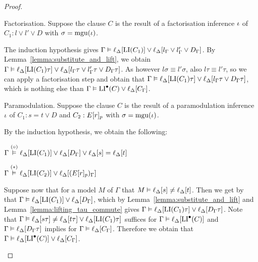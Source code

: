 \documentclass[,%
	draft=false,%
	numbers=noendperiod
	11pt,
	a4paper,
	oneside,%
	openany,
]{memoir}
\begin{document}
\begin{proof}
\begin{description}

		\item{} Factorisation. 
			Suppose the clause $C$ is the result of a factorisation inference $\iota$ of $C_1: l \lor l' \lor D$ with $\sigma=\operatorname{mgu}(\iota)$.
			
			The induction hypothesis gives $\Gamma \vDash \ell_{\Delta}[ \operatorname{LI}(C_1) ] \lor \ell_{\Delta}[ l_\Gamma \lor l'_\Gamma \lor D_\Gamma ]$.
			By Lemma~\ref{lemma:substitute_and_lift}, we obtain
			$\Gamma \vDash \ell_{\Delta}[ \operatorname{LI}(C_1)\tau ] \lor \ell_{\Delta}[ l_\Gamma\tau \lor l'_\Gamma\tau \lor D_\Gamma\tau ]$.
			As however $l\sigma \equiv l'\sigma$, 
			also $l\tau \equiv l'\tau$, so we can apply a factorisation step and obtain that
			$\Gamma \vDash \ell_{\Delta}[ \operatorname{LI}(C_1)\tau ] \lor \ell_{\Delta}[ l_\Gamma\tau \lor D_\Gamma\tau ]$,
			which is nothing else than $\Gamma \vDash \operatorname{LI}^\bullet(C) \lor \ell_{\Delta}[C_\Gamma]$.

		\item{} Paramodulation.
			Suppose the clause $C$ is the result of a paramodulation inference\nolinebreak{} $\iota$ of $C_1: s=t \lor D$ and $C_2: E{[r]_{p}}$ with $\sigma=\operatorname{mgu}(\iota)$.

			By the induction hypothesis, we obtain the following: 

			$\Gamma \stackrel{(\circ)}{\vDash} \ell_{\Delta}[\operatorname{LI}(C_1)] \lor \ell_{\Delta}[D_\Gamma] \lor \ell_{\Delta}[s]=\ell_{\Delta}[t]$

			$\Gamma \stackrel{(*)}{\vDash} \ell_{\Delta}[\operatorname{LI}(C_2)] \lor \ell_{\Delta}[(E{[r]_{p}})_\Gamma]$

			Suppose now that for a model $M$ of $\Gamma$ that $M \vDash \ell_{\Delta}[s]\neq \ell_{\Delta}[t]$.
			Then we get by \markA{} that $\Gamma \vDash \ell_{\Delta}[\operatorname{LI}(C_1)] \lor \ell_{\Delta}[D_\Gamma]$, which by Lemma~\ref{lemma:substitute_and_lift} and Lemma~\ref{lemma:lifting_tau_commute} gives $\Gamma \vDash \ell_{\Delta}[\operatorname{LI}(C_1)\tau] \lor \ell_{\Delta}[D_\Gamma\tau]$.
			Note that $\Gamma \vDash \ell_{\Delta}[s\tau]\neq \ell_{\Delta}[t\tau] \lor \ell_{\Delta}[\operatorname{LI}(C_1)\tau]$ suffices for $\Gamma \vDash \ell_{\Delta}[\operatorname{LI}^\bullet(C)]$ and $\Gamma \vDash \ell_{\Delta}[D_\Gamma\tau]$ implies for $\Gamma \vDash \ell_{\Delta}[C_\Gamma]$.
			Therefore we obtain that 
			$\Gamma \vDash \ell_{\Delta}[\operatorname{LI}^\bullet(C)] \lor \ell_{\Delta}[C_\Gamma]$.


\end{description}
\end{proof}
\end{document}
